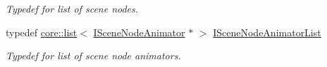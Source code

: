 \begin{DoxyCompactItemize}
\begin{DoxyCompactList}\small\item\em Typedef for list of scene nodes. \end{DoxyCompactList}\item 
\mbox{\label{namespaceirr_1_1scene_a4699e14043e59f91c454ffc13edd953c}} 
typedef \hyperlink{classirr_1_1core_1_1list}{core\+::list}$<$ \hyperlink{classirr_1_1scene_1_1ISceneNodeAnimator}{I\+Scene\+Node\+Animator} $\ast$ $>$ \hyperlink{namespaceirr_1_1scene_a4699e14043e59f91c454ffc13edd953c}{I\+Scene\+Node\+Animator\+List}
\begin{DoxyCompactList}\small\item\em Typedef for list of scene node animators. \end{DoxyCompactList}\end{DoxyCompactItemize}
